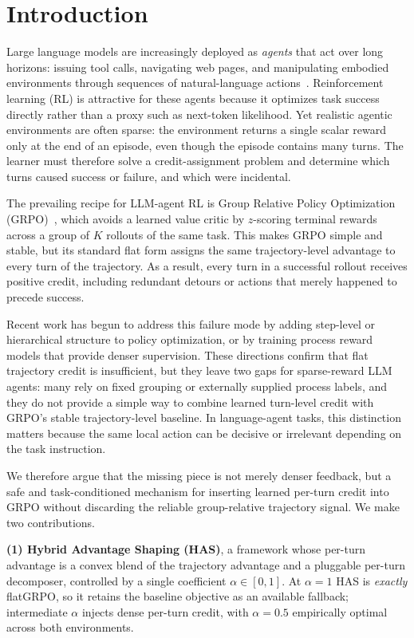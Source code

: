 \documentclass{article}
\begin{document}
\section{Introduction}
Large language models are increasingly deployed as \emph{agents} that act over long horizons:
issuing tool calls, navigating web pages, and manipulating embodied environments through
sequences of natural-language actions~\citep{yao2023react}. Reinforcement learning (RL) is
attractive for these agents because it optimizes task success directly rather than a proxy such
as next-token likelihood. Yet realistic agentic environments are often sparse: the environment
returns a single scalar reward only at the end of an episode, even though the episode contains
many turns. The learner must therefore solve a credit-assignment problem and determine which
turns caused success or failure, and which were incidental.

The prevailing recipe for LLM-agent RL is Group Relative Policy Optimization
(GRPO)~\citep{shao2024deepseekmath,guo2025deepseekr1}, which avoids a learned value critic by
$z$-scoring terminal rewards across a group of $K$ rollouts of the same task. This makes GRPO
simple and stable, but its standard flat form assigns the same trajectory-level advantage to
every turn of the trajectory. As a result, every turn in a successful rollout receives positive
credit, including redundant detours or actions that merely happened to precede success.

Recent work has begun to address this failure mode by adding step-level or hierarchical
structure to policy optimization, or by training process reward models that provide denser
supervision. These directions confirm that flat trajectory credit is insufficient, but they leave
two gaps for sparse-reward LLM agents: many rely on fixed grouping or externally supplied
process labels, and they do not provide a simple way to combine learned turn-level credit with
GRPO's stable trajectory-level baseline. In language-agent tasks, this distinction matters
because the same local action can be decisive or irrelevant depending on the task instruction.

We therefore argue that the missing piece is not merely denser feedback, but a safe and
task-conditioned mechanism for inserting learned per-turn credit into GRPO without discarding
the reliable group-relative trajectory signal. We make two contributions.

\textbf{(1) Hybrid Advantage Shaping (HAS)}, a framework whose per-turn advantage is a convex
blend of the trajectory advantage and a pluggable per-turn decomposer, controlled by a single
coefficient $\alpha \in [0,1]$. At $\alpha{=}1$ HAS is \emph{exactly} flatGRPO, so it
retains the baseline objective as an available fallback; intermediate $\alpha$ injects dense
per-turn credit, with $\alpha{=}0.5$ empirically optimal across both environments.
\end{document}
